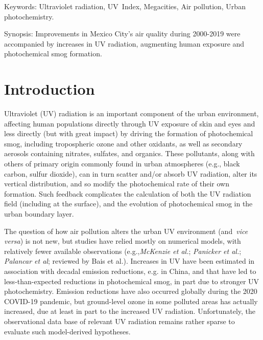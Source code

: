 \documentclass[10pt]{article}
\begin{document}
\sloppy


Keywords: Ultraviolet radiation, UV~Index, Megacities, Air pollution,
Urban photochemistry.

Synopsis: Improvements in Mexico City's air quality during 2000-2019
were accompanied by increases in UV radiation, augmenting human exposure
and photochemical smog formation.

\section*{Introduction}

 {\label{123750}}

Ultraviolet (UV) radiation is an important component of the urban
environment, affecting human populations directly through UV exposure of
skin and eyes \cite{Taylor_1988,Varotsos_1997,Lucas_2019} and less directly (but with great
impact) by driving the formation of photochemical smog, including
tropospheric ozone and other oxidants, as well as secondary aerosols
containing nitrates, sulfates, and organics.\cite{LEIGHTON_1961,Seinfeld_1998,Finlayson_Pitts_2000} These
pollutants, along with others of primary origin commonly found in urban
atmospheres (e.g., black carbon, sulfur dioxide), can in turn scatter
and/or absorb UV radiation, alter its vertical distribution, and so
modify the photochemical rate of their own formation. Such feedback
complicates the calculation of both the UV radiation field (including at
the surface), and the evolution of photochemical smog in the urban
boundary layer.

The question of how air pollution alters the urban UV environment
(and~\emph{vice versa}) is not new, but studies have relied mostly on
numerical models,\cite{Liu_1991,Sabziparvar_1998,Madronich_2011} with relatively fewer available
observations (e.g.,\emph{McKenzie et al.}\cite{McKenzie_2008}; \emph{Panicker et al.}\cite{Panicker_2009}; \emph{Palancar et al}\cite{Palancar_2013};
reviewed by Bais et al.\cite{Bais_2015}). Increases in UV have been
estimated in association with decadal emission reductions, e.g. in
China,\cite{Hollaway_2019,Li_2018,Wang_2020} and that have led to less-than-expected
reductions in photochemical smog, in part due to stronger UV
photochemistry.\cite{Wang_2019,Gao_2020,Ma_2020} Emission reductions have also occurred
globally during the 2020 COVID-19 pandemic,\cite{Bauwens_2020,Venter_2020} but
ground-level ozone in some polluted areas has actually
increased,\cite{Shi_2020,Le_2020} due at least in part to the increased UV
radiation. Unfortunately, the observational data base of relevant UV
radiation remains rather sparse to evaluate such model-derived
hypotheses.~~
\end{document}
